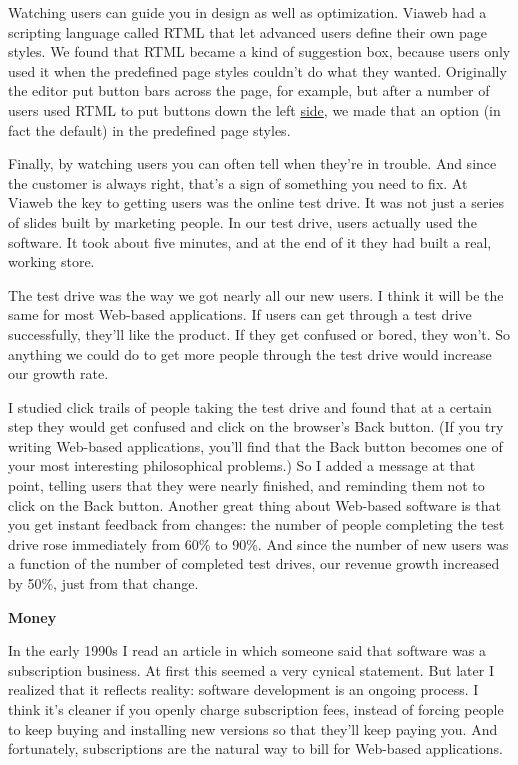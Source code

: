 \documentclass[12pt]{book}
\begin{document}
Watching users can guide you in design as well as optimization. Viaweb
had a scripting language called RTML that let advanced users define
their own page styles. We found that RTML became a kind of suggestion
box, because users only used it when the predefined page styles couldn't
do what they wanted. Originally the editor put button bars across the
page, for example, but after a number of users used RTML to put buttons
down the left
\href{https://sep.turbifycdn.com/ca/I/paulgraham_1656_3563}{side}, we
made that an option (in fact the default) in the predefined page styles.

Finally, by watching users you can often tell when they're in trouble.
And since the customer is always right, that's a sign of something you
need to fix. At Viaweb the key to getting users was the online test
drive. It was not just a series of slides built by marketing people. In
our test drive, users actually used the software. It took about five
minutes, and at the end of it they had built a real, working store.

The test drive was the way we got nearly all our new users. I think it
will be the same for most Web-based applications. If users can get
through a test drive successfully, they'll like the product. If they get
confused or bored, they won't. So anything we could do to get more
people through the test drive would increase our growth rate.

I studied click trails of people taking the test drive and found that at
a certain step they would get confused and click on the browser's Back
button. (If you try writing Web-based applications, you'll find that the
Back button becomes one of your most interesting philosophical
problems.) So I added a message at that point, telling users that they
were nearly finished, and reminding them not to click on the Back
button. Another great thing about Web-based software is that you get
instant feedback from changes: the number of people completing the test
drive rose immediately from 60\% to 90\%. And since the number of new
users was a function of the number of completed test drives, our revenue
growth increased by 50\%, just from that change.

\textbf{Money}

In the early 1990s I read an article in which someone said that software
was a subscription business. At first this seemed a very cynical
statement. But later I realized that it reflects reality: software
development is an ongoing process. I think it's cleaner if you openly
charge subscription fees, instead of forcing people to keep buying and
installing new versions so that they'll keep paying you. And
fortunately, subscriptions are the natural way to bill for Web-based
applications.
\end{document}
